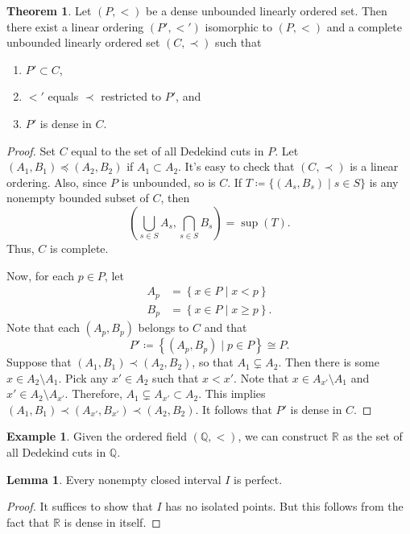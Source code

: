 \documentclass[10pt,letterpaper,cm]{nupset}
\theoremstyle{definition}
\newtheorem{exmp}[definition]{Example}
\theoremstyle{theorem}
\newtheorem{theorem}[definition]{Theorem}
\newtheorem{lemma}[definition]{Lemma}
\theoremstyle{remark}
\newcommand{\Q}{\mathbb Q}
\newcommand{\R}{\mathbb R}
\newcommand{\1}{\mathbf{1}}
\newcommand{\0}{\vec 0}
\begin{document}
\begin{theorem}
Let $\left(P, <\right)$ be a dense unbounded linearly ordered set. Then there exist a linear ordering $\left(P', <'\right)$ isomorphic to $\left(P, <\right)$ and a complete unbounded linearly ordered set $\left(C, \prec\right)$ such that
\begin{enumerate}[label=(\alph*)]
\item $P' \subset C$,
\item $<'$ equals $\prec$ restricted to $P'$, and
\item $P'$ is dense in $C$.
\end{enumerate}
\end{theorem}
\begin{proof}
Set $C$ equal to the set of all Dedekind cuts in $P$. Let $\left(A_1, B_1\right)\preceq \left(A_2, B_2\right)$ if $A_1\subset A_2$. It's easy to check that $\left(C, \prec\right)$ is  a linear ordering. Also, since $P$ is unbounded, so is $C$. If $T\coloneqq \{(A_s, B_s) \mid s\in S\}$ is any nonempty bounded subset of $C$, then $$\left(\bigcup_{s\in S} A_s, \bigcap_{s\in S} B_s\right) = \sup(T).$$ Thus, $C$ is complete. 

\smallskip

Now, for each $p\in P$, let 
\begin{align*}
A_p & = \left\{x\in P \mid x<p\right\}
\\ B_p & = \left\{x\in P \mid x\geq p\right\}.
\end{align*}
Note that each $\left(A_p, B_p\right)$ belongs to $C$ and that $$P' \coloneqq \left\{(A_p, B_p) \mid p\in P\right\} \cong P.$$ Suppose that $\left(A_1, B_1\right) \prec \left(A_2, B_2\right)$, so that $A_1 \subsetneq A_2$. Then there is some $x\in A_2 \setminus A_1$. Pick any $x' \in A_2$ such that $x<x'$. Note that $x\in A_{x'} \setminus A_1$ and $x'\in A_2\setminus A_{x'}$. Therefore, $A_1 \subsetneq A_{x'} \subset A_2$. This implies $\left(A_1, B_1\right) \prec \left(A_{x'}, B_{x'}\right) \prec \left(A_2, B_2\right)$. It follows that $P'$ is dense in $C$. 
\end{proof}

\begin{exmp}
Given the ordered field $\left(\Q, <\right)$, we can construct $\R$ as the set of all Dedekind cuts in $\Q$.
\end{exmp}

\begin{lemma}
Every nonempty closed interval $I$ is perfect.
\end{lemma}
\begin{proof}
It suffices to show that $I$ has no isolated points. But this follows from the fact that $\R$ is dense in itself. 
\end{proof}
\end{document}
